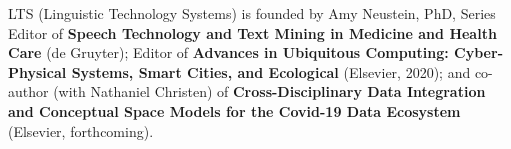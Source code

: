 \documentclass[11pt,letterpaper]{article}
\newcommand{\llMOSAIC}{\mbox{{\LARGE MOSAIC}}}
\newcommand{\llWC}{\mbox{{\LARGE WhiteCharmDB}}}
\begin{document}
\setlength{\skip\footins}{18pt}	
	
{\linespread{1.2}\selectfont

\vspace*{1.5em}

\begin{center}



\vspace{1em}

\begin{tcolorbox}
[
arc=2pt,outer arc=0pt,
enhanced jigsaw,
width=\textwidth,
colback=ctmppppy!40,
colframe=logoRed!30!darkRed,
drop shadow=logoPurple!50!darkRed,
]
\begin{minipage}{\textwidth}	
\begin{center}	
{\setlength{\fboxsep}{32pt}
	}
\end{center}
\end{minipage}
\end{tcolorbox}
\end{center}

\vspace*{2pt}
\begin{center}
\parbox{.88\textwidth}{%
{\fontsize{9}{9}\selectfont   
LTS (Linguistic Technology Systems) is founded by 
Amy Neustein, PhD, Series Editor of {\textbf{Speech Technology 
and Text Mining in Medicine and Health Care}} (de Gruyter); 
Editor of {\textbf{Advances in Ubiquitous Computing: 
Cyber-Physical Systems, Smart Cities, 
and Ecological }} 
(Elsevier, 2020); and 
co-author (with Nathaniel Christen) 
of {\textbf{Cross-Disciplinary Data Integration 
and Conceptual Space Models
for the Covid-19 Data Ecosystem}} 
(Elsevier, forthcoming).}}\end{center}

}
\end{document}
